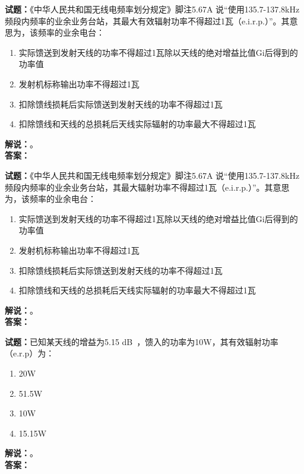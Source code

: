 \documentclass{ctexbook}
\begin{document}
\vspace{\baselineskip}

\noindent\textbf{试题：}《中华人民共和国无线电频率划分规定》脚注5.67A 说“使用135.7-137.8\unit{\kHz}频段内频率的业余业务台站，其最大有效辐射功率不得超过1瓦（e.i.r.p.）”。其意思为，该频率的业余电台：
\begin{enumerate}[leftmargin=3em]
  \item 实际馈送到发射天线的功率不得超过1瓦除以天线的绝对增益比值Gi后得到的功率值
  \item 发射机标称输出功率不得超过1瓦
  \item 扣除馈线损耗后实际馈送到发射天线的功率不得超过1瓦
  \item 扣除馈线和天线的总损耗后天线实际辐射的功率最大不得超过1瓦
\end{enumerate}
\noindent\textbf{解说：}\textbf{}。\\\noindent\textbf{答案：}

\vspace{\baselineskip}

\noindent\textbf{试题：}《中华人民共和国无线电频率划分规定》脚注5.67A 说“使用135.7-137.8\unit{\kHz}频段内频率的业余业务台站，其最大辐射功率不得超过1瓦（e.i.r.p.）”。其意思为，该频率的业余电台：
\begin{enumerate}[leftmargin=3em]
  \item 实际馈送到发射天线的功率不得超过1瓦除以天线的绝对增益比值Gi后得到的功率值
  \item 发射机标称输出功率不得超过1瓦
  \item 扣除馈线损耗后实际馈送到发射天线的功率不得超过1瓦
  \item 扣除馈线和天线的总损耗后天线实际辐射的功率最大不得超过1瓦
\end{enumerate}
\noindent\textbf{解说：}\textbf{}。\\\noindent\textbf{答案：}

\vspace{\baselineskip}

\noindent\textbf{试题：}已知某天线的增益为5.15 \unit[qualifier-mode=combine]{\deci\bel{}}，馈入的功率为10W，其有效辐射功率（e.r.p）为：
\begin{enumerate}[leftmargin=3em]
  \item 20W
  \item 51.5W
  \item 10W
  \item 15.15W
\end{enumerate}
\noindent\textbf{解说：}\textbf{}。\\\noindent\textbf{答案：}
\end{document}
